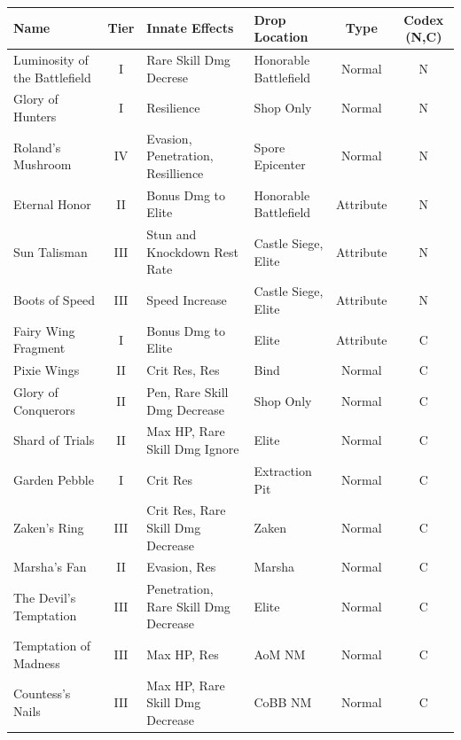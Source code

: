 \documentclass[]{article}
\begin{document}
\begin{center}
\begin{tabular}{|>{\centering}m{4cm}|c|>{\centering}m{4cm}|>{\centering}m{3cm}|c|c|}
	\hline 
	Name & Tier & Innate Effects & Drop Location & Type & Codex (N,C) \\ 
	\hline 
	Luminosity of the Battlefield & I & Rare Skill Dmg Decrese & Honorable Battlefield & Normal& N \\ 
	Glory of Hunters & I & Resilience & Shop Only & Normal&N \\ 
	Roland's Mushroom & IV & Evasion, Penetration, Resillience & Spore Epicenter & Normal&N \\ 
	Eternal Honor & II & Bonus Dmg to Elite & Honorable Battlefield & Attribute&N \\ 
	Sun Talisman & III & Stun and Knockdown Rest Rate & Castle Siege, Elite & Attribute & N\\ 
	Boots of Speed & III & Speed Increase & Castle Siege, Elite & Attribute & N\\ 
	Fairy Wing Fragment & I & Bonus Dmg to Elite &Elite& Attribute& C\\
	
	Pixie Wings & II & Crit Res, Res & Bind&Normal & C\\
	
	Glory of Conquerors & II & Pen, Rare Skill Dmg Decrease & Shop Only& Normal & C\\
	
	Shard of Trials & II & Max HP, Rare Skill Dmg Ignore & Elite& Normal & C\\
	
	Garden Pebble & I & Crit Res & Extraction Pit& Normal & C\\
	
	Zaken's Ring & III & Crit Res, Rare Skill Dmg Decrease & Zaken&Normal & C\\
	
	Marsha's Fan & II & Evasion, Res & Marsha&Normal & C\\
	
	The Devil's Temptation & III & Penetration, Rare Skill Dmg Decrease & Elite&Normal & C\\
	
	Temptation of Madness & III & Max HP, Res & AoM NM&Normal & C\\
	
	Countess's Nails & III & Max HP, Rare Skill Dmg Decrease & CoBB NM&Normal & C\\
	\hline
\end{tabular} 
\pagebreak


\end{center}
\end{document}
